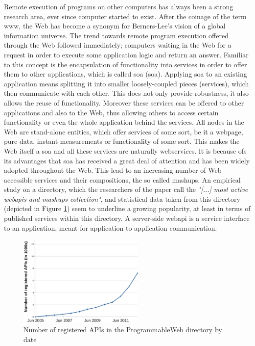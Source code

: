 Remote execution of programs on other computers has always been a strong research area, ever since computer started to exist.
After the coinage of the term \textrm{\gls{www}}\cite{DBLP:journals/en/Berners-LeeCGP92}, the Web has become a synonym for Berners-Lee's vision of a global information universe.
The trend towards remote program execution offered through the Web followed immediately; computers waiting in the Web for a request in order to execute some application logic and return an answer.
Familiar to this concept is the encapsulation of functionality into services\cite{peltz2003web} in order to offer them to other applications, which is called \textrm{\acrlong{soa} (\acrshort{soa})}\cite{perrey2003service}.
Applying \textrm{\acrshort{soa}} to an existing application means splitting it into smaller loosely-coupled pieces (services), which then communicate with each other.
This does not only provide robustness, it also allows the reuse of functionality.
Moreover these services can be offered to other applications and also to the Web, thus allowing others to access certain functionality or even the whole application behind the services.
All nodes in the Web are stand-alone entities, which offer services of some sort, be it a webpage, pure data, instant measurements or functionality of some sort.
This makes the Web itself a \textrm{\acrlong{soa}} and all these services are naturally \textrm{\glspl{webservice}}.
It is because ofs its advantages that \textrm{\acrshort{soa}} has received a great deal of attention and has been widely adopted throughout the Web.
This lead to an increasing number of Web accessible services and their compositions, the so called \textrm{\glspl{mashup}}.
An empirical study\cite{conf/icws/HuangFT12} on a directory, which the researchers of the paper call the \textit{"[...] most active \gls{webapi}s and mashups collection"}, and statistical data taken from this directory (depicted in Figure \ref{fig:NumOfAPIs}) seem to underline a growing popularity, at least in terms of published services within this directory.
A server-side \textrm{\gls{webapi}} is a service interface to an application, meant for application to application communication.

\begin{figure}[!ht]
  \centering
  \includegraphics[width=0.55\textwidth]{figures/NumOfAPIs}
  \caption{Number of registered APIs in the ProgrammableWeb directory by date}
  \label{fig:NumOfAPIs}
\end{figure}


